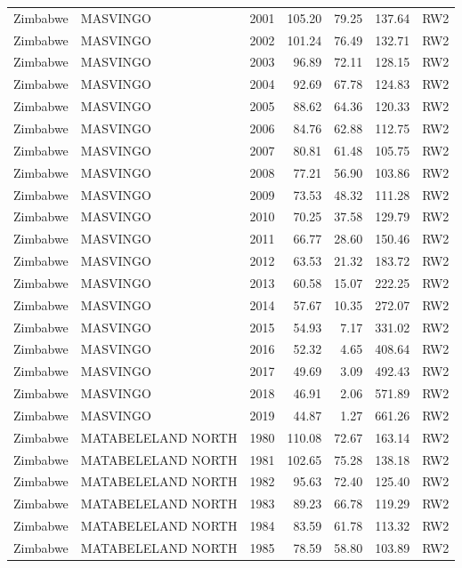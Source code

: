 \begin{longtable}{lllrrrl}
  Zimbabwe & MASVINGO & 2001 & 105.20 & 79.25 & 137.64 & RW2 \\ 
  Zimbabwe & MASVINGO & 2002 & 101.24 & 76.49 & 132.71 & RW2 \\ 
  Zimbabwe & MASVINGO & 2003 & 96.89 & 72.11 & 128.15 & RW2 \\ 
  Zimbabwe & MASVINGO & 2004 & 92.69 & 67.78 & 124.83 & RW2 \\ 
  Zimbabwe & MASVINGO & 2005 & 88.62 & 64.36 & 120.33 & RW2 \\ 
  Zimbabwe & MASVINGO & 2006 & 84.76 & 62.88 & 112.75 & RW2 \\ 
  Zimbabwe & MASVINGO & 2007 & 80.81 & 61.48 & 105.75 & RW2 \\ 
  Zimbabwe & MASVINGO & 2008 & 77.21 & 56.90 & 103.86 & RW2 \\ 
  Zimbabwe & MASVINGO & 2009 & 73.53 & 48.32 & 111.28 & RW2 \\ 
  Zimbabwe & MASVINGO & 2010 & 70.25 & 37.58 & 129.79 & RW2 \\ 
  Zimbabwe & MASVINGO & 2011 & 66.77 & 28.60 & 150.46 & RW2 \\ 
  Zimbabwe & MASVINGO & 2012 & 63.53 & 21.32 & 183.72 & RW2 \\ 
  Zimbabwe & MASVINGO & 2013 & 60.58 & 15.07 & 222.25 & RW2 \\ 
  Zimbabwe & MASVINGO & 2014 & 57.67 & 10.35 & 272.07 & RW2 \\ 
  Zimbabwe & MASVINGO & 2015 & 54.93 & 7.17 & 331.02 & RW2 \\ 
  Zimbabwe & MASVINGO & 2016 & 52.32 & 4.65 & 408.64 & RW2 \\ 
  Zimbabwe & MASVINGO & 2017 & 49.69 & 3.09 & 492.43 & RW2 \\ 
  Zimbabwe & MASVINGO & 2018 & 46.91 & 2.06 & 571.89 & RW2 \\ 
  Zimbabwe & MASVINGO & 2019 & 44.87 & 1.27 & 661.26 & RW2 \\ 
  Zimbabwe & MATABELELAND NORTH & 1980 & 110.08 & 72.67 & 163.14 & RW2 \\ 
  Zimbabwe & MATABELELAND NORTH & 1981 & 102.65 & 75.28 & 138.18 & RW2 \\ 
  Zimbabwe & MATABELELAND NORTH & 1982 & 95.63 & 72.40 & 125.40 & RW2 \\ 
  Zimbabwe & MATABELELAND NORTH & 1983 & 89.23 & 66.78 & 119.29 & RW2 \\ 
  Zimbabwe & MATABELELAND NORTH & 1984 & 83.59 & 61.78 & 113.32 & RW2 \\ 
  Zimbabwe & MATABELELAND NORTH & 1985 & 78.59 & 58.80 & 103.89 & RW2 \\ 

\end{longtable}
